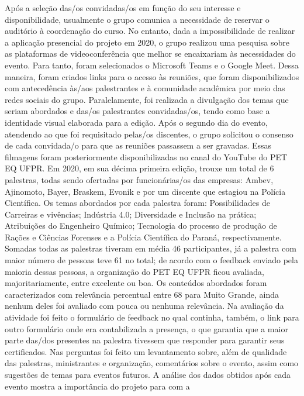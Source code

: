 Após a seleção das/os convidadas/os em função do seu interesse e disponibilidade, 
usualmente o grupo comunica a necessidade de reservar o auditório à coordenação do curso. No 
entanto, dada a impossibilidade de realizar a aplicação presencial do projeto em 2020, o grupo 
realizou uma pesquisa sobre as plataformas de videoconferência que melhor se encaixariam às 
necessidades do evento. Para tanto, foram selecionados o Microsoft Teams e o Google Meet.
Dessa maneira, foram criados links para o acesso às reuniões, que foram disponibilizados 
com antecedência às/aos palestrantes e à comunidade acadêmica por meio das redes sociais do 
grupo. Paralelamente, foi realizada a divulgação dos temas que seriam abordados e das/os 
palestrantes convidadas/os, tendo como base a identidade visual elaborada para a edição.
Após o segundo dia do evento, atendendo ao que foi requisitado pelas/os discentes, o grupo 
solicitou o consenso de cada convidada/o para que as reuniões passassem a ser gravadas. Essas 
filmagens foram posteriormente disponibilizadas no canal do YouTube do PET EQ UFPR.
Em 2020, em sua décima primeira edição, trouxe um total de 6 palestras, todas sendo 
ofertadas por funcionárias/os das empresas: Ambev, Ajinomoto, Bayer, Braskem, Evonik e por 
um discente que estagiou na Polícia Científica. Os temas abordados por cada palestra foram:
Possibilidades de Carreiras e vivências; Indústria 4.0; Diversidade e Inclusão na prática; 
Atribuições do Engenheiro Químico; Tecnologia do processo de produção de Rações e Ciências 
Forenses e a Polícia Científica do Paraná, respectivamente.
Somadas todas as palestras tiveram em média 46 participantes, já a palestra com maior 
número de pessoas teve 61 no total; de acordo com o feedback enviado pela maioria dessas 
pessoas, a organização do PET EQ UFPR ficou avaliada, majoritariamente, entre excelente ou boa. 
Os conteúdos abordados foram caracterizados com relevância percentual entre 68%
para Muito Grande, ainda nenhum deles foi avaliado com pouca ou nenhuma relevância.
Na avaliação da atividade foi feito o formulário de feedback no qual continha, também, o 
link para outro formulário onde era contabilizada a presença, o que garantia que a maior parte 
das/dos presentes na palestra tivessem que responder para garantir seus certificados. 
Nas perguntas foi feito um levantamento sobre, além de qualidade das palestras, 
ministrantes e organização, comentários sobre o evento, assim como sugestões de temas para 
eventos futuros. 
A análise dos dados obtidos após cada evento mostra a importância do projeto para com a 

